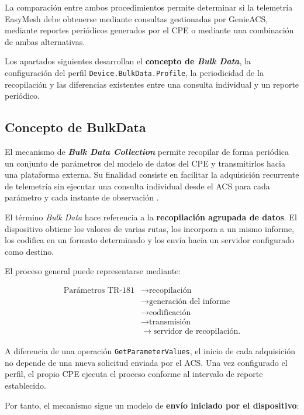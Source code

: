 La comparación entre ambos procedimientos permite determinar si la
telemetría EasyMesh debe obtenerse mediante consultas gestionadas por
GenieACS, mediante reportes periódicos generados por el CPE o mediante una
combinación de ambas alternativas.

Los apartados siguientes desarrollan el
\textbf{concepto de \textit{Bulk Data}}, la configuración del perfil
\texttt{Device.BulkData.Profile}, la periodicidad de la recopilación y
las diferencias existentes entre una consulta individual y un reporte
periódico.

\subsection{Concepto de BulkData}
\label{subsec:concepto-bulkdata}

El mecanismo de \textbf{\textit{Bulk Data Collection}} permite recopilar
de forma periódica un conjunto de parámetros del modelo de datos del CPE
y transmitirlos hacia una plataforma externa. Su finalidad consiste en
facilitar la adquisición recurrente de telemetría sin ejecutar una
consulta individual desde el ACS para cada parámetro y cada instante de
observación \cite{bbf_tr181}.

El término \textit{Bulk Data} hace referencia a la
\textbf{recopilación agrupada de datos}. El dispositivo obtiene los
valores de varias rutas, los incorpora a un mismo informe, los codifica
en un formato determinado y los envía hacia un servidor configurado como
destino.

El proceso general puede representarse mediante:

\[
\begin{aligned}
    \text{Parámetros TR-181}
    &\longrightarrow
    \text{recopilación}\\
    &\longrightarrow
    \text{generación del informe}\\
    &\longrightarrow
    \text{codificación}\\
    &\longrightarrow
    \text{transmisión}\\
    &\longrightarrow
    \text{servidor de recopilación}.
\end{aligned}
\]

A diferencia de una operación
\texttt{GetParameterValues}, el inicio de cada adquisición no depende de
una nueva solicitud enviada por el ACS. Una vez configurado el perfil, el
propio CPE ejecuta el proceso conforme al intervalo de reporte
establecido.

Por tanto, el mecanismo sigue un modelo de
\textbf{envío iniciado por el dispositivo}:

